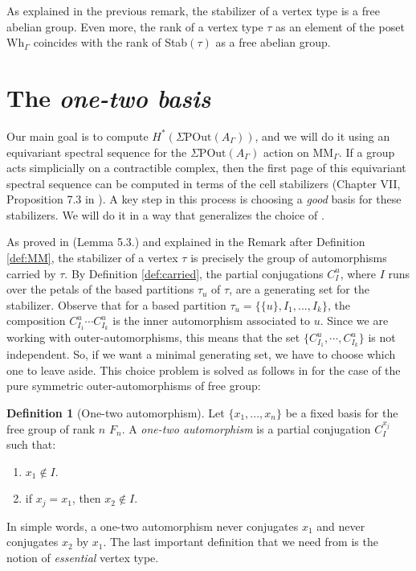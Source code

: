 \documentclass[a4paper]{amsart}
\newcommand{\G}{\Gamma}
\newcommand{\A}{{A_\Gamma}}
\newcommand{\POut}{\Sigma\mathrm{POut}}
\newcommand{\MM}{\mathrm{MM}}
\newcommand{\Wh}{\mathrm{Wh}}
\theoremstyle{definition}
\newtheorem{defi}[teo]{Definition}
\theoremstyle{remark}
\begin{document}
As explained in the previous remark, the stabilizer of a vertex type is a free abelian group. Even more, the rank of a vertex type $\tau$ as an element of the poset $\Wh_\G$ coincides with the rank of Stab$(\tau)$ as a free abelian group.



\section{The \textit{one-two basis}}
\label{sec:3}

Our main goal is to compute $H^*(\POut(A_\G))$, and we will do it using an  equivariant spectral sequence for the  $\POut(\A)$ action on $\MM_\G$.  If  a group acts simplicially on  a contractible complex, then the first page of this equivariant spectral sequence can be computed in terms of the cell stabilizers (Chapter VII, Proposition 7.3 in \cite{Brown}). A key step in this process is choosing a \textit{good} basis for these stabilizers. We will do it in a way that generalizes the choice of \cite{JMcCM}. 

As proved in  \cite{ArMar} (Lemma 5.3.) and explained in the Remark after Definition \ref{def:MM}, the stabilizer of a vertex $\tau$ is precisely the group of automorphisms carried by $\tau$. By Definition \ref{def:carried}, the partial conjugations $C_I^u$, where $I$ runs over the petals of the based partitions $\tau_u$ of $\tau$, are a generating set for the stabilizer. Observe  that for a  based partition $\tau_u=\{\{u\},I_1,...,I_k\}$, the composition $C_{I_1}^u\cdots C_{I_k}^u$ is the inner automorphism associated to $u$. Since we are working with  outer-automorphisms, this means that the set $\{C_{I_1}^u,\cdots, C_{I_k}^u\}$ is not independent. So, if we want a minimal generating set, we have to choose which one to leave aside. This choice problem is solved as follows in \cite{JMcCM} for the case of the pure symmetric outer-automorphisms of free group:

\begin{defi}[One-two automorphism]
    Let $\{x_1,...,x_n\}$ be a fixed basis for  the free group of rank $n$ $F_n$. A \textit{one-two automorphism} is a partial conjugation $C_I^{x_j}$ such that:
    \begin{enumerate}
        \item[1)] $x_1\notin I$. 
        \item[2)] if $x_j=x_1$, then $x_2\notin I$. 
    \end{enumerate} \label{defi:one-two_aut}
\end{defi}
In simple words, a one-two automorphism never conjugates $x_1$ and never conjugates $x_2$ by $x_1$. The last important definition that we need from \cite{JMcCM} is the notion of  \textit{essential} vertex type.
\end{document}
